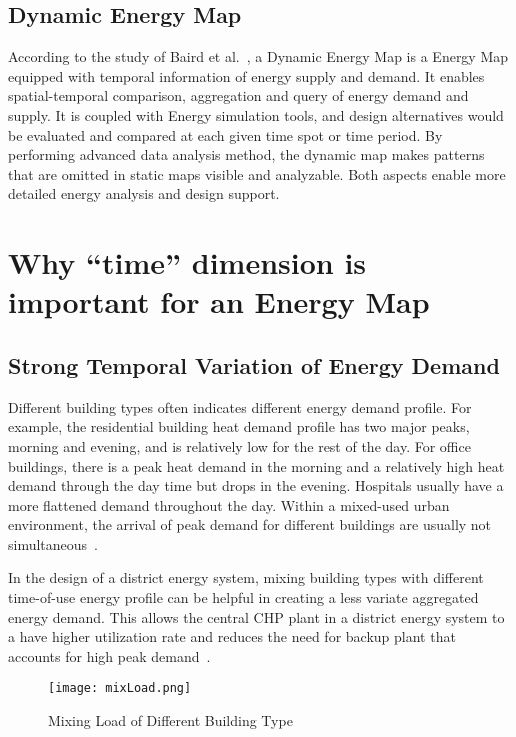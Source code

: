 \subsection{Dynamic Energy Map}
According to the study of Baird et al.\ , a Dynamic Energy Map is a
Energy Map equipped with temporal information of energy supply and
demand. It enables spatial-temporal comparison, aggregation and query
of energy demand and supply. It is coupled with Energy simulation
tools, and design alternatives would be evaluated and compared at each
given time spot or time period. By performing advanced data analysis
method, the dynamic map makes patterns that are omitted in static maps
visible and analyzable. Both aspects enable more detailed energy
analysis and design support.

\section{Why ``time'' dimension is important for an Energy Map}
\subsection{Strong Temporal Variation of Energy Demand}
Different building types often indicates different energy demand
profile. For example, the residential building heat demand profile has
two major peaks, morning and evening, and is relatively low for the
rest of the day. For office buildings, there is a peak heat demand in
the morning and a relatively high heat demand through the day time but
drops in the evening. Hospitals usually have a more flattened demand
throughout the day. Within a mixed-used urban environment, the arrival
of peak demand for different buildings are usually not
simultaneous~\cite{decentralHeatMap2011}.

In the design of a district energy system, mixing building types with
different time-of-use energy profile can be helpful in creating a less
variate aggregated energy demand. This allows the central CHP plant in
a district energy system to a have higher utilization rate and reduces
the need for backup plant that accounts for high peak
demand~\cite{decentralHeatMap2011}.

\begin{figure}[h!]
  \centering
  \texttt{[image: mixLoad.png]}
  \caption[Mixing Load Graph]{Mixing Load of Different Building
    Type~\cite{decentralHeatMap2011}}
  \label{fig:mixLoad}
\end{figure}

